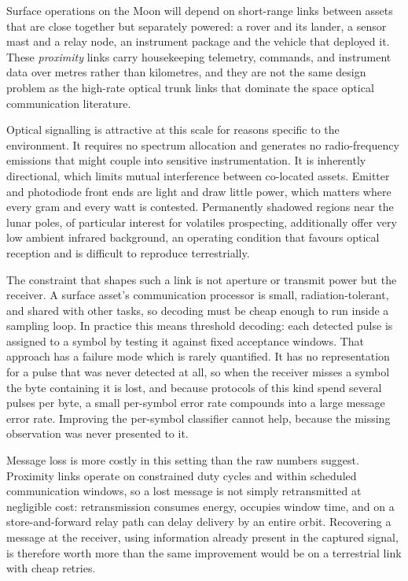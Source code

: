 Surface operations on the Moon will depend on short-range links between assets
that are close together but separately powered: a rover and its lander, a
sensor mast and a relay node, an instrument package and the vehicle that
deployed it. These \emph{proximity} links carry housekeeping telemetry,
commands, and instrument data over metres rather than kilometres, and they are
not the same design problem as the high-rate optical trunk links that dominate
the space optical communication literature.

Optical signalling is attractive at this scale for reasons specific to the
environment. It requires no spectrum allocation and generates no
radio-frequency emissions that might couple into sensitive instrumentation. It
is inherently directional, which limits mutual interference between co-located
assets. Emitter and photodiode front ends are light and draw little power,
which matters where every gram and every watt is contested. Permanently
shadowed regions near the lunar poles, of particular interest for volatiles
prospecting, additionally offer very low ambient infrared background, an
operating condition that favours optical reception and is difficult to
reproduce terrestrially.

The constraint that shapes such a link is not aperture or transmit power but
the receiver. A surface asset's communication processor is small,
radiation-tolerant, and shared with other tasks, so decoding must be cheap
enough to run inside a sampling loop. In practice this means threshold
decoding: each detected pulse is assigned to a symbol by testing it against
fixed acceptance windows. That approach has a failure mode which is rarely
quantified. It has no representation for a pulse that was never detected at
all, so when the receiver misses a symbol the byte containing it is lost, and
because protocols of this kind spend several pulses per byte, a small
per-symbol error rate compounds into a large message error rate. Improving the
per-symbol classifier cannot help, because the missing observation was never
presented to it.

Message loss is more costly in this setting than the raw numbers suggest.
Proximity links operate on constrained duty cycles and within scheduled
communication windows, so a lost message is not simply retransmitted at
negligible cost: retransmission consumes energy, occupies window time, and on a
store-and-forward relay path can delay delivery by an entire orbit. Recovering
a message at the receiver, using information already present in the captured
signal, is therefore worth more than the same improvement would be on a
terrestrial link with cheap retries.


